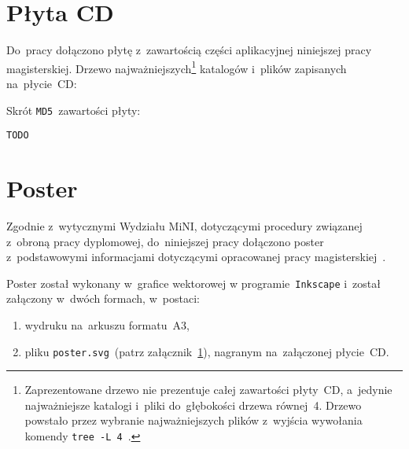 \documentclass[thesis]{subfiles}
\begin{document}

\begin{appendices}

\chapter{Płyta CD}
\label{cd-appendix}

Do~pracy dołączono płytę z~zawartością części aplikacyjnej niniejszej pracy magisterskiej. Drzewo najważniejszych\footnote{Zaprezentowane drzewo nie prezentuje całej zawartości płyty~CD, a~jedynie najważniejsze katalogi i~pliki do~głębokości drzewa równej~4. Drzewo powstało przez wybranie najważniejszych plików z~wyjścia wywołania komendy \mbox{\texttt{tree~-L~4}}~\cite{tree-manual}.} katalogów i~plików zapisanych na~płycie~CD: %

\noindent Skrót \texttt{MD5}~zawartości płyty:
\begin{center}
\texttt{TODO}
\end{center}

\chapter{Poster}
Zgodnie z~wytycznymi Wydziału MiNI, dotyczącymi procedury związanej z~obroną pracy dyplomowej, do~niniejszej pracy dołączono poster z~podstawowymi informacjami dotyczącymi opracowanej pracy magisterskiej~\cite{informacje-dot-obron}.

Poster został wykonany w~grafice wektorowej w programie~\texttt{Inkscape} i~został załączony w~dwóch formach, w~postaci:
\begin{enumerate}
	\item wydruku na~arkuszu formatu~A3,
	\item pliku \mbox{\texttt{poster.svg}}~(patrz załącznik~\ref{cd-appendix}), nagranym na~załączonej płycie~CD.
\end{enumerate}

\end{appendices}
\end{document}
